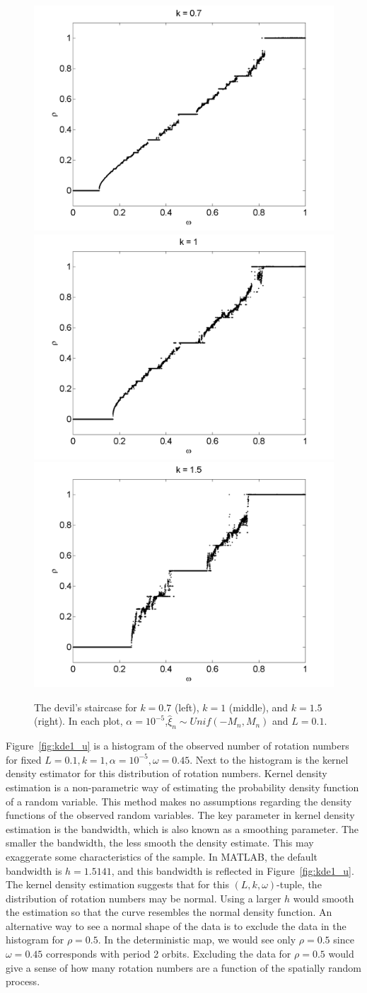 \begin{figure}[H]\linespread{1}
\caption[The devil's staircase for the random circle map, varying $k$
(uniform distribution), $\alpha = 10^{-5}$]{The devil's
  staircase for $k=0.7$ (left), $k=1$ (middle), and $k=1.5$
  (right). In each plot, $\alpha = 10^{-5}$,$\hat{\xi}_n\sim Unif(-M_n,M_n)$ and $L = 0.1$.}\label{fig:randdevil2_u}
\centering
\includegraphics[width=.33\textwidth]{figs/rcirc_u_devil_k07_L01.png}\hfill
\includegraphics[width=.33\textwidth]{figs/rcirc_u_devil_k1_L01.png}\hfill
\includegraphics[width=.33\textwidth]{figs/rcirc_u_devil_k15_L01.png}
\end{figure}

Figure~\ref{fig:kde1_u} is a histogram of the observed number of
rotation numbers for fixed $L=0.1,k=1,\alpha=10^{-5},\omega=0.45$. Next to the
histogram is the kernel density estimator for this distribution of
rotation numbers. Kernel density estimation is a non-parametric way of
estimating the probability density function of a random variable. This
method makes no assumptions regarding the density functions of the
observed random variables. The key parameter in kernel density
estimation is the bandwidth, which is also known as a smoothing
parameter. The smaller the bandwidth, the less smooth the density
estimate. This may exaggerate some characteristics of the sample. In
MATLAB, the default bandwidth is $h=1.5141$, and this bandwidth is reflected
in Figure~\ref{fig:kde1_u}. The kernel density estimation suggests
that for this $(L,k,\omega)$-tuple, the distribution of rotation numbers may be
normal. Using a larger $h$ would smooth the estimation so that the
curve resembles the normal density function. An alternative way to see
a normal shape of the data is to exclude the data in the histogram for $\rho=0.5$. In
the deterministic map, we would see only $\rho=0.5$ since
$\omega=0.45$ corresponds with period 2 orbits. Excluding the data for
$\rho=0.5$ would give a sense of how many rotation numbers are a
function of the spatially random process.  

